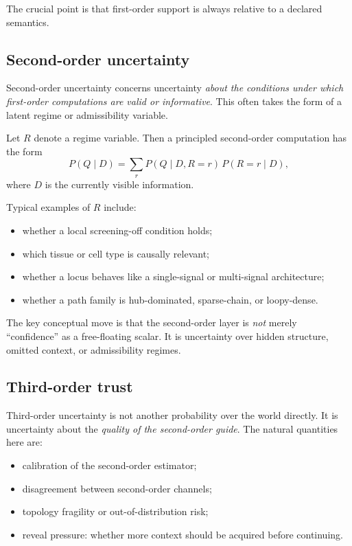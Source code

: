 \documentclass[11pt]{article}
\begin{document}
The crucial point is that first-order support is always relative to a declared semantics.

\subsection{Second-order uncertainty}
Second-order uncertainty concerns uncertainty \emph{about the conditions under which first-order computations are valid or informative}. This often takes the form of a latent regime or admissibility variable.

Let $R$ denote a regime variable. Then a principled second-order computation has the form
\begin{equation}
P(Q \mid D) = \sum_r P(Q \mid D, R=r)\,P(R=r \mid D),
\end{equation}
where $D$ is the currently visible information.

Typical examples of $R$ include:
\begin{itemize}
    \item whether a local screening-off condition holds;
    \item which tissue or cell type is causally relevant;
    \item whether a locus behaves like a single-signal or multi-signal architecture;
    \item whether a path family is hub-dominated, sparse-chain, or loopy-dense.
\end{itemize}

The key conceptual move is that the second-order layer is \emph{not} merely ``confidence'' as a free-floating scalar. It is uncertainty over hidden structure, omitted context, or admissibility regimes.

\subsection{Third-order trust}
Third-order uncertainty is not another probability over the world directly. It is uncertainty about the \emph{quality of the second-order guide}. The natural quantities here are:
\begin{itemize}
    \item calibration of the second-order estimator;
    \item disagreement between second-order channels;
    \item topology fragility or out-of-distribution risk;
    \item reveal pressure: whether more context should be acquired before continuing.
\end{itemize}
\end{document}
